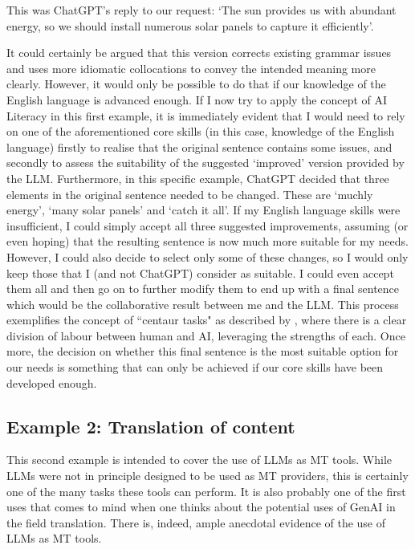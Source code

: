 \documentclass[output=paper]{langscibook}
\begin{document}
This was ChatGPT’s reply to our request:
\ea
‘The sun provides us with abundant energy, so we should install numerous solar panels to capture it efficiently’.
\z

It could certainly be argued that this version corrects existing grammar issues and uses more idiomatic collocations to convey the intended meaning more clearly. However, it would only be possible to do that if our knowledge of the English language is advanced enough. If I now try to apply the concept of AI Literacy in this first example, it is immediately evident that I would need to rely on one of the aforementioned core skills (in this case, knowledge of the English language) firstly to realise that the original sentence contains some issues, and secondly to assess the suitability of the suggested ‘improved’ version provided by the LLM. Furthermore, in this specific example, ChatGPT decided that three elements in the original sentence needed to be changed. These are ‘muchly energy’, ‘many solar panels’ and ‘catch it all’. If my English language skills were insufficient, I could simply accept all three suggested improvements, assuming (or even hoping) that the resulting sentence is now much more suitable for my needs. However, I could also decide to select only some of these changes, so I would only keep those that I (and not ChatGPT) consider as suitable. I could even accept them all and then go on to further modify them to end up with a final sentence which would be the collaborative result between me and the LLM. This process exemplifies the concept of ``centaur tasks" as described by \citet{mollick2023}, where there is a clear division of labour between human and AI, leveraging the strengths of each. Once more, the decision on whether this final sentence is the most suitable option for our needs is something that can only be achieved if our core skills have been developed enough.

\subsection{Example 2: Translation of content}
This second example is intended to cover the use of LLMs as MT tools. While LLMs were not in principle designed to be used as MT providers, this is certainly one of the many tasks these tools can perform. It is also probably one of the first uses that comes to mind when one thinks about the potential uses of GenAI in the field translation. There is, indeed, ample anecdotal evidence of the use of LLMs as MT tools.
\end{document}
